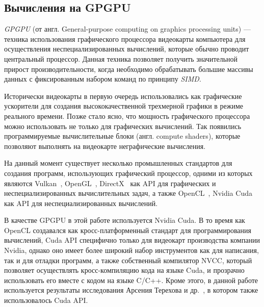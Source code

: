 
\subsection{Вычисления на GPGPU}

\textit{GPGPU} (от англ. General-purpose computing on graphics processing units) --- техника использования графического процессора видеокарты компьютера для осуществления неспециализированных вычислений, которые обычно проводит центральный процессор. Данная техника позволяет получить значительной прирост производительности, когда необходимо обрабатывать большие массивы данных с фиксированным набором команд по принципу \textit{SIMD}. 

Исторически видеокарты в первую очередь использовались как графические ускорители для создания высококачественной трехмерной графики в режиме реального времени. Позже стало ясно, что мощность графического процессора можно использовать не только для графических вычислений. Так появились программируемые вычислительные блоки (англ. compute shaders), которые позволяют выполнять на видеокарте неграфические вычисления.

На данный момент существует несколько промышленных стандартов для создания программ, использующих графический процессор, одними из которых являются Vulkan~\cite{net:spec_vulkan}, OpenGL~\cite{net:spec_opengl}, DirectX~\cite{net:spec_direct3d} как API для графических и неспециализированных вычислительных задач, а также OpenCL~\cite{net:spec_opencl}, Nvidia Cuda~\cite{net:cuda_toolkit_docs} как API для неспециализированных вычислений. 

В качестве GPGPU в этой работе используется Nvidia Cuda. В то время как OpenCL создавался как кросс-платформенный стандарт для программирования вычислений, Cuda API специфично только для видеокарт производства компании Nvidia, однако оно имеет более широкий набор инструментов как для написания, так и для отладки программ, а также собственный компилятор NVCC, который позволяет осуществлять кросс-компиляцию кода на языке Cuda, и прозрачно использовать его вместе с кодом на языке C/C++. Кроме этого, в данной работе используется результаты исследования Арсения Терехова и др.~\cite{inproceedings:cfqp_matrix_with_single_source}, в котором также использовалось Cuda API.

